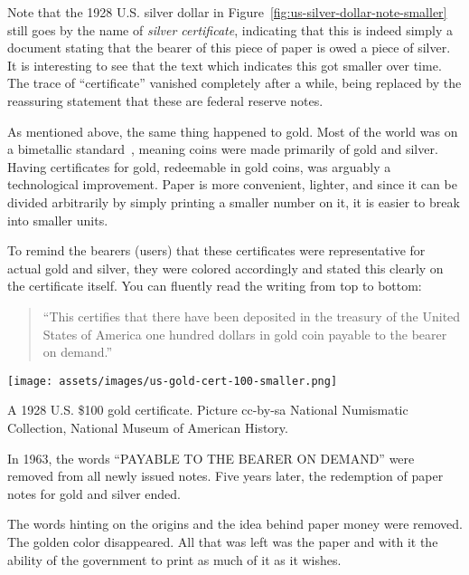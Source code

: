 Note that the 1928 U.S. silver dollar in
Figure~\ref{fig:us-silver-dollar-note-smaller} still goes by the name of
\textit{silver certificate}, indicating that this is indeed simply a document
stating that the bearer of this piece of paper is owed a piece of silver. It is
interesting to see that the text which indicates this got smaller over time. The
trace of \enquote{certificate} vanished completely after a while, being replaced
by the reassuring statement that these are federal reserve notes.

As mentioned above, the same thing happened to gold. Most of the world was on a
bimetallic standard~\cite{wiki:bimetallism}, meaning coins were made
primarily of gold and silver. Having certificates for gold, redeemable in gold
coins, was arguably a technological improvement. Paper is more convenient,
lighter, and since it can be divided arbitrarily by simply printing a smaller
number on it, it is easier to break into smaller units.

To remind the bearers (users) that these certificates were
representative for actual gold and silver, they were colored accordingly
and stated this clearly on the certificate itself. You can fluently read
the writing from top to bottom:

\begin{quotation}\begin{samepage}
\enquote{This certifies that there have been deposited in the treasury of the
United States of America one hundred dollars in gold coin payable to
the bearer on demand.}
\end{samepage}\end{quotation}

\begin{center}
  \centering
  \texttt{[image: assets/images/us-gold-cert-100-smaller.png]}
  \caption{A 1928 U.S. \$100 gold certificate. Picture cc-by-sa National Numismatic Collection, National Museum of American History.}
  \label{fig:us-gold-cert-100-smaller}
\end{center}

In 1963, the words \enquote{PAYABLE TO THE BEARER ON DEMAND} were removed from
all newly issued notes. Five years later, the redemption of paper notes
for gold and silver ended.

The words hinting on the origins and the idea behind paper money were
removed. The golden color disappeared. All that was left was the paper
and with it the ability of the government to print as much of it as it
wishes.

